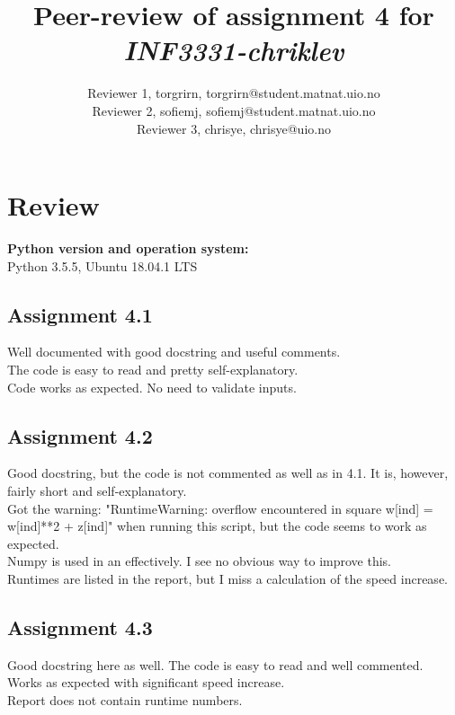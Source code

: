 \documentclass[a4paper]{article}
\title{Peer-review of assignment 4 for \textit{INF3331-chriklev}}
\author{Reviewer 1, torgrirn, {torgrirn@student.matnat.uio.no} \\
 		Reviewer 2, sofiemj, {sofiemj@student.matnat.uio.no} \\
		Reviewer 3, chrisye, {chrisye@uio.no}}
\begin{document}
\maketitle







\section{Review}\label{sec:review}

\textbf{Python version and operation system:}\\
Python 3.5.5, Ubuntu 18.04.1 LTS
\subsection*{Assignment 4.1}
Well documented with good docstring and useful comments.\\
The code is easy to read and pretty self-explanatory. \\
Code works as expected. No need to validate inputs. \\

\subsection*{Assignment 4.2} \label{sec:assignment5.2}
Good docstring, but the code is not commented as well as in 4.1. It is, however, fairly short and self-explanatory.\\
Got the warning: "RuntimeWarning: overflow encountered in square w[ind] = w[ind]**2 + z[ind]" when running this script, but the code seems to work as expected.\\
Numpy is used in an effectively. I see no obvious way to improve this.\\
Runtimes are listed in the report, but I miss a calculation of the speed increase.\\



\subsection*{Assignment 4.3}
Good docstring here as well. The code is easy to read and well commented.\\
Works as expected with significant speed increase.\\
Report does not contain runtime numbers.\\
\end{document}
